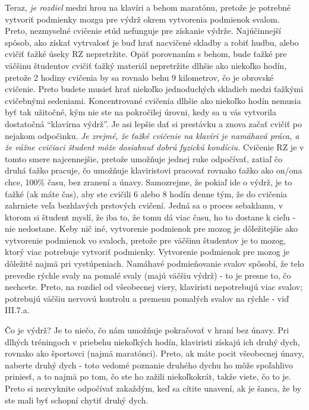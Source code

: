 Teraz, \textit{je rozdiel} medzi hrou na klavíri a behom maratónu, pretože je potrebné vytvoriť podmienky mozgu pre výdrž okrem vytvorenia podmienok svalom. Preto, nezmyselné cvičenie etúd nefunguje pre získanie výdrže. Najúčinnejší spôsob, ako získať vytrvalosť je buď hrať nacvičené skladby a robiť hudbu, alebo cvičiť ťažké úseky RZ nepretržite. Opäť porovnaním s behom, bude ťažké pre väčšinu študentov cvičiť ťažký materiál nepretržite dlhšie ako niekoľko hodín, pretože 2 hodiny cvičenia by sa rovnalo behu 9 kilometrov, čo je obrovské cvičenie. Preto budete musieť hrať niekoľko jednoduchých skladieb medzi ťažkými cvičebnými sedeniami. Koncentrované cvičenia dlhšie ako niekoľko hodín nemusia byť tak užitočné, kým nie ste na pokročilej úrovni, kedy sa u vás vytvorila dostatočná “klavírna výdrž”. Je asi lepšie dať si prestávku a znova začať cvičiť po nejakom odpočinku. \emph{Je zrejmé, že ťažké cvičenie na klavíri je namáhavá práca, a že vážne cvičiaci študent môže dosiahnuť dobrú fyzickú kondíciu.} Cvičenie RZ je v tomto smere najcennejšie, pretože umožňuje jednej ruke odpočívať, zatiaľ čo druhá ťažko pracuje, čo umožňuje klaviristovi pracovať rovnako ťažko ako on/ona chce, 100\% času, bez zranení a únavy. Samozrejme, že pokiaľ ide o výdrž, je to ťažké (ak máte čas), aby ste cvičili 6 alebo 8 hodín denne tým, že do cvičenia zahrniete veľa bezhlavých prstových cvičení. Jedná sa o proces sebaklamu, v ktorom si študent myslí, že iba to, že tomu dá viac času, ho to dostane k cieľu - nie nedostane. Keby nič iné, vytvorenie podmienok pre mozog je dôležitejšie ako vytvorenie podmienok vo svaloch, pretože pre väčšinu študentov je to mozog, ktorý viac potrebuje vytvoriť podmienky. Vytvorenie podmienok pre mozog je dôležité najmä pri vystúpeniach. Namáhavé podmieňovanie svalov spôsobí, že telo prevedie rýchle svaly na pomalé svaly (majú väčšiu výdrž) - to je presne to, čo nechcete. Preto, na rozdiel od všeobecnej viery, klaviristi nepotrebujú viac svalov; potrebujú väčšiu nervovú kontrolu a premenu pomalých svalov na rýchle - viď III.7.a.

Čo je výdrž? Je to niečo, čo nám umožňuje pokračovať v hraní bez únavy. Pri dlhých tréningoch v priebehu niekoľkých hodín, klaviristi získajú ich druhý dych, rovnako ako športovci (najmä maratónci). Preto, ak máte pocit všeobecnej únavy, naberte druhý dych - toto vedomé poznanie druhého dychu ho môže spoľahlivo priniesť, a to najmä po tom, čo ste ho zažili niekoľkokrát, takže viete, čo to je. Preto si nezvyknite odpočívať zakaždým, keď sa cítite unavení, ak je šanca, že by ste mali byť schopní chytiť druhý dych.

